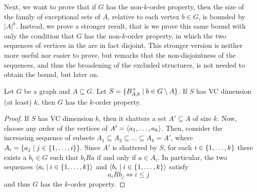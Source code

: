     Next, we want to prove that if $G$ has the non-$k$-order property, then the size of the family of exceptional
    sets of $A$, relative to each vertex $b \in G$, is bounded by $|A|^k$.
    Instead, we prove a stronger result, that is we prove this same bound with only the condition that $G$
    has the  non-$k$-order property, in which the two sequences of vertices in the 
    are in fact disjoint.
    This stronger version is neither more useful nor easier to prove, but remarks that the non-disjointness of the sequences,
    and thus the broadening of the excluded structures, is not needed to obtain the bound, but later on.

    \begin{lemma} \label{lem:vc_dimension_implies_k_order_property}
        Let $G$ be a graph and $A \subseteq G$.
        Let $S = \{ B^+_{A,b} \mid b \in G \setminus A \}$.
        If $S$ has VC dimension (at least) $k$, then $G$ has the $k$-order property.
        \begin{proof}
            If $S$ has VC dimension $k$, then it shatters a set $A' \subseteq A$ of size $k$.
            Now, choose any order of the vertices of $A' = \left< a_1, \dots, a_k \right>$.
            Then, consider the increasing sequence of subsets $A_1 \subseteq A_2 \subseteq \dots \subseteq A_k = A'$,
            where $A_i = \{ a_j \mid j \in \{ 1, \dots, i \} \}$.
            Since $A'$ is shattered by $S$, for each $i \in \{ 1, \dots, k \}$ there exists a $b_i \in G$ such that
            $b_i R a$ if and only if $a \in A_i$.
            In particular, the two sequences $\left< a_i \mid i \in \{ 1, \dots, k \} \right>$ and
            $\left< b_i \mid i \in \{ 1, \dots, k \} \right>$ satisfy
            \[
                a_i R b_j \Leftrightarrow i \leq j
            \]
            and thus $G$ has the $k$-order property.
        \end{proof}
    \end{lemma}

